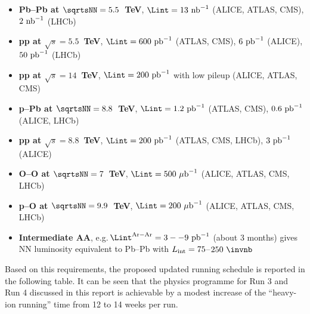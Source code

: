 \documentclass[../report.tex]{subfiles}
\begin{document}
\begin{itemize}

\item {\bf Pb--Pb at $\sqrtsNN=5.5$~TeV}, $\Lint=13~{\rm nb}^{-1}$ (ALICE, ATLAS, CMS), $2~{\rm nb}^{-1}$ (LHCb)

\item {\bf pp at $\sqrt s=5.5$~TeV}, $\Lint=600~{\rm pb}^{-1}$ (ATLAS, CMS), $6~{\rm pb}^{-1}$ (ALICE),  $50~{\rm pb}^{-1}$ (LHCb) 

\item {\bf pp at $\sqrt s=14$~TeV}, $\Lint=200~{\rm pb}^{-1}$ with low pileup (ALICE, ATLAS, CMS)

\item {\bf p--Pb at $\sqrtsNN=8.8$~TeV}, $\Lint=1.2~{\rm pb}^{-1}$ (ATLAS, CMS), $0.6~{\rm pb}^{-1}$ (ALICE, LHCb) 

\item {\bf pp at $\sqrt s=8.8$~TeV}, $\Lint=200~{\rm pb}^{-1}$ (ATLAS, CMS, LHCb), $3~{\rm pb}^{-1}$ (ALICE)

\item {\bf O--O at $\sqrtsNN=7$~TeV}, $\Lint=500~{\rm \mu b}^{-1}$ (ALICE, ATLAS, CMS, LHCb)

\item {\bf p--O at $\sqrtsNN=9.9$~TeV}, $\Lint=200~{\rm \mu b}^{-1}$ (ALICE, ATLAS, CMS, LHCb)

\item {\bf Intermediate AA}, e.g.\,$\Lint^{\rm Ar-Ar}=3--9~{\rm pb}^{-1}$ (about 3 months) gives NN luminosity equivalent to Pb--Pb with $L_{\rm int} =75$--$250~\invnb$

\end{itemize}

Based on this requirements, the proposed updated running schedule is reported in the following table. It can be seen that the physics programme for Run 3 and Run 4 discussed in this report is achievable by a modest increase of the ``heavy-ion running'' time from 12 to 14 weeks per run.
\end{document}
